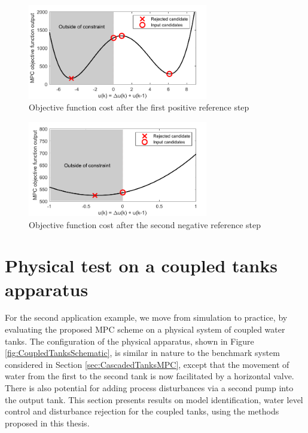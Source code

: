 \begin{figure}[h]
\centering
\includegraphics[width=0.7\textwidth]{Chapter11_ControlStudy/ImpossibleGlobalMin.pdf}
\caption{Objective function cost after the first positive reference step}
\label{fig:ImpossibleGlobalMin_MPC}
\end{figure}

\begin{figure}[h]
\centering
\includegraphics[width=0.7\textwidth]{Chapter11_ControlStudy/ImpossibleGlobalMin_negativestep.pdf}
\caption{Objective function cost after the second negative reference step}
\label{fig:ImpossibleGlobalMin_negativestep_MPC}
\end{figure}

\section{Physical test on a coupled tanks apparatus}

For the second application example, we move from simulation to practice, by evaluating the proposed MPC scheme on a physical system of coupled water tanks. The configuration of the physical apparatus, shown in Figure \ref{fig:CoupledTanksSchematic}, is similar in nature to the benchmark system considered in Section \ref{sec:CascadedTanksMPC}, except that the movement of water from the first to the second tank is now facilitated by a horizontal valve. There is also potential for adding process disturbances via a second pump into the output tank. This section presents results on model identification, water level control and disturbance rejection for the coupled tanks, using the methods proposed in this thesis. 

